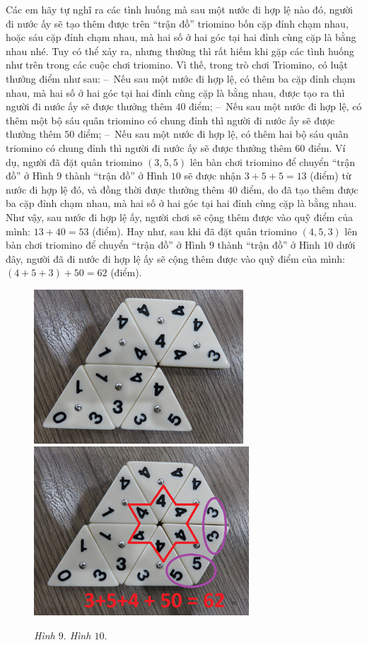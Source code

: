 	Các em hãy tự nghĩ ra các tình huống mà sau một nước đi hợp lệ nào đó, người đi nước ấy sẽ tạo thêm được trên “trận đồ” triomino bốn cặp đỉnh chạm nhau, hoặc sáu cặp đỉnh chạm nhau, mà hai số ở hai góc tại hai đỉnh cùng cặp là bằng nhau nhé.
	\vskip 0.1cm
	Tuy có thể xảy ra, nhưng thường thì rất hiếm khi gặp các tình huống như trên trong các cuộc chơi triomino. Vì thế, trong trò chơi Triomino, có luật thưởng điểm như sau:
	\vskip 0.1cm
	--\ Nếu sau một nước đi hợp lệ, có thêm ba cặp đỉnh chạm nhau, mà hai số ở hai góc tại hai đỉnh cùng cặp là bằng nhau, được tạo ra thì người đi nước ấy sẽ được thưởng thêm $40$ điểm;
	\vskip 0.1cm
	--\ Nếu sau một nước đi hợp lệ, có thêm một bộ sáu quân triomino có chung đỉnh thì người đi nước ấy sẽ được thưởng thêm $50$ điểm;
	\vskip 0.1cm
	--\ Nếu sau một nước đi hợp lệ, có thêm hai bộ sáu quân triomino có chung đỉnh thì người đi nước ấy sẽ được thưởng thêm $60$ điểm.
	\vskip 0.1cm
	Ví dụ, người đã đặt quân triomino $(3, 5, 5)$ lên bàn chơi triomino để chuyển “trận đồ” ở Hình $9$ thành “trận đồ” ở Hình $10$ sẽ được nhận
	\vskip 0.1cm
	\hspace*{100pt}$3+5+5=13$ (điểm)
	\vskip 0.1cm
	từ nước đi hợp lệ đó, và đồng thời được thưởng thêm $40$ điểm, do đã tạo thêm được ba cặp đỉnh chạm nhau, mà hai số ở hai góc tại hai đỉnh cùng cặp là bằng nhau. Như vậy, sau nước đi hợp lệ ấy, người chơi sẽ cộng thêm được vào quỹ điểm của mình:
	\vskip 0.1cm
	\hspace*{100pt} $13+40=53$ (điểm).
	\vskip 0.1cm
	Hay như, sau khi đã đặt quân triomino $(4, 5, 3)$ lên bàn chơi triomino để chuyển “trận đồ” ở Hình $9$ thành “trận đồ” ở Hình $10$ dưới đây, người đã đi nước đi hợp lệ ấy sẽ cộng thêm được vào quỹ điểm của mình:
	\vskip 0.1cm
	\hspace*{80pt} $(4+5+3)+50 =62$ (điểm).
	\begin{figure}[H]
		\centering
		\captionsetup{labelformat=empty, justification=centering}
		\includegraphics[height=0.3\textwidth]{h9a}
		\includegraphics[height=0.3\textwidth]{h10a}
			\caption{\textit{\small Hình $9.$ \hspace*{75pt} Hình $10.$}}
	\end{figure}
